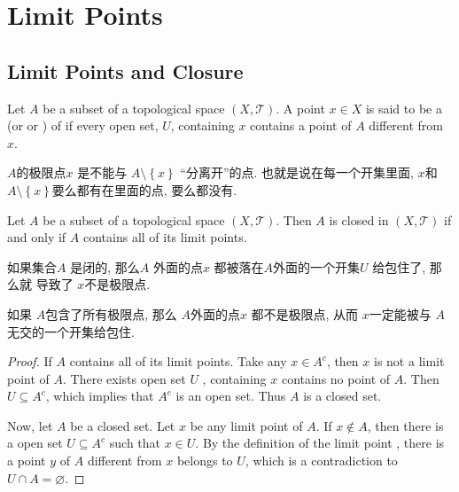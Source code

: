\documentclass[../main.tex]{subfiles}
\begin{document}
\ifSubfilesClassLoaded{

    \tableofcontents
    
}{}

\chapter{ Limit Points }

\section{Limit Points and Closure}

\begin{definition}{}{}
Let $A$ be a subset of a topological space $(X, \mathcal{T})$. A point $x \in X$ is said to be a  (or  or ) of  if every open set, $U$, containing $x$ contains a point of $A$ different from $x$.
\end{definition}
\begin{note}
    \(  A  \)的极限点\(  x  \) 是不能与 \(  A\setminus \left\{ x \right\}  \) ``分离开''的点.  也就是说在每一个开集里面, \(  x  \)和 \(  A\setminus \left\{ x \right\}  \)要么都有在里面的点, 要么都没有.  
\end{note}
\begin{proposition}{}{}
Let $A$ be a subset of a topological space $(X, \mathcal{T})$. Then $A$ is closed in $(X, \mathcal{T})$ if and only if $A$ contains all of its limit points.
\end{proposition}

\begin{proofsketch}
    如果集合\(  A  \) 是闭的, 那么\(  A  \) 外面的点\(  x  \) 都被落在\(  A  \)外面的一个开集\(  U  \) 给包住了, 那么就 导致了 \(  x  \)不是极限点. 
    
    如果 \(  A  \)包含了所有极限点, 那么 \(  A  \)外面的点\(  x  \) 都不是极限点,  从而 \(  x  \)一定能被与 \(  A  \)无交的一个开集给包住.  
\end{proofsketch}

\begin{proof}
    If \(  A  \) contains all of its limit points. Take any \(  x \in A^{c}  \),  then \(  x  \) is not a limit point of \(  A  \). There exists open set \(  U  \) , containing \(  x  \) contains no point of \(  A  \). Then \(  U\subseteq A^{c}  \), which implies that \(  A^{c}  \) is an open set. Thus \(  A  \) is a closed set.
    
    Now, let \(  A  \) be a closed set. Let \(  x  \) be any limit point of \(  A  \). If \(  x \not \in A  \),  then there is a open set \(  U\subseteq A^{c}  \) such that \(  x \in U  \). By the definition of the limit point , there is a point \(  y  \) of \(  A  \) different from \(  x  \) belongs to \(  U  \), which is a contradiction to \(  U \cap A= \varnothing  \). 
\end{proof}
\end{document}
